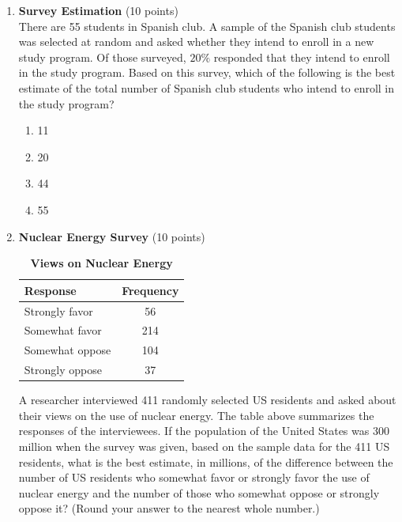 \begin{enumerate}
  \item \textbf{Survey Estimation} (10 points)\\
  There are 55 students in Spanish club. A sample of the Spanish club students was selected at random and asked whether they intend to enroll in a new study program. Of those surveyed, $20\%$ responded that they intend to enroll in the study program. Based on this survey, which of the following is the best estimate of the total number of Spanish club students who intend to enroll in the study program?
  \begin{enumerate}[label=(\Alph*)]
    \item 11
    \item 20
    \item 44
    \item 55
  \end{enumerate}
  \begin{subanswer}
  \end{subanswer}

  \newpage

  \item \textbf{Nuclear Energy Survey} (10 points)\\
    \begin{table}[h!]
    \centering
    \renewcommand{\arraystretch}{1.3}
    \setlength{\tabcolsep}{8pt}
    \caption*{\textbf{Views on Nuclear Energy}}
    \begin{tabular}{|l|c|}
    \hline
    \rowcolor[HTML]{E0E0E0}
    \textbf{Response} & \textbf{Frequency} \\
    \hline
    Strongly favor    & 56  \\
    Somewhat favor    & 214 \\
    Somewhat oppose   & 104 \\
    Strongly oppose   & 37  \\
    \hline
    \end{tabular}
    \end{table}
  A researcher interviewed 411 randomly selected US residents and asked about their views on the use of nuclear energy. The table above summarizes the responses of the interviewees. If the population of the United States was 300 million when the survey was given, based on the sample data for the 411 US residents, what is the best estimate, in millions, of the difference between the number of US residents who somewhat favor or strongly favor the use of nuclear energy and the number of those who somewhat oppose or strongly oppose it? (Round your answer to the nearest whole number.)
  \begin{subanswer}
  \end{subanswer}


\end{enumerate}
